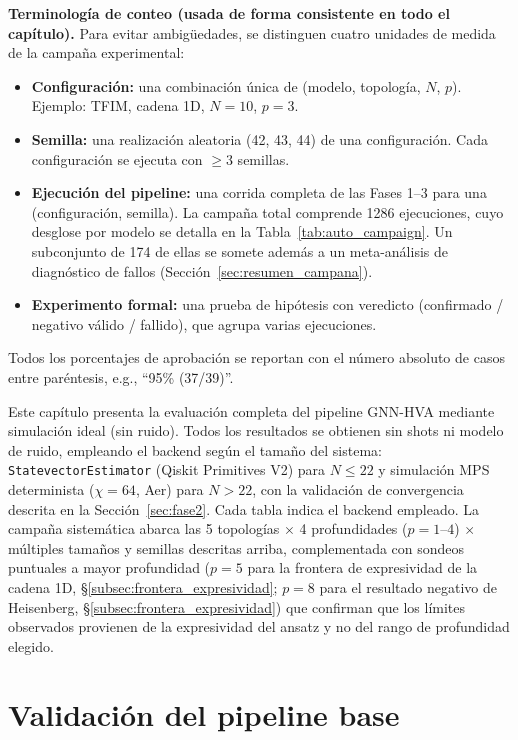 \documentclass[11pt,a4paper,spanish]{book}
\begin{document}
\noindent\textbf{Terminología de conteo (usada de forma consistente en todo el capítulo).} Para evitar ambigüedades, se distinguen cuatro unidades de medida de la campaña experimental:
\begin{itemize}
    \item \textbf{Configuración:} una combinación única de (modelo, topología, $N$, $p$). Ejemplo: TFIM, cadena 1D, $N = 10$, $p = 3$.
    \item \textbf{Semilla:} una realización aleatoria (42, 43, 44) de una configuración. Cada configuración se ejecuta con $\geq 3$ semillas.
    \item \textbf{Ejecución del pipeline:} una corrida completa de las Fases 1--3 para una (configuración, semilla). La campaña total comprende 1286 ejecuciones, cuyo desglose por modelo se detalla en la Tabla~\ref{tab:auto_campaign}. Un subconjunto de 174 de ellas se somete además a un meta-análisis de diagnóstico de fallos (Sección~\ref{sec:resumen_campana}).
    \item \textbf{Experimento formal:} una prueba de hipótesis con veredicto (confirmado / negativo válido / fallido), que agrupa varias ejecuciones.
\end{itemize}
\noindent Todos los porcentajes de aprobación se reportan con el número absoluto de casos entre paréntesis, e.g., ``95\% (37/39)''.

Este capítulo presenta la evaluación completa del pipeline GNN-HVA mediante simulación ideal (sin ruido). Todos los resultados se obtienen sin shots ni modelo de ruido, empleando el backend según el tamaño del sistema: \texttt{StatevectorEstimator} (Qiskit Primitives V2) para $N \leq 22$ y simulación MPS determinista ($\chi = 64$, Aer) para $N > 22$, con la validación de convergencia descrita en la Sección~\ref{sec:fase2}. Cada tabla indica el backend empleado. La campaña sistemática abarca las 5 topologías $\times$ 4 profundidades ($p = 1$--$4$) $\times$ múltiples tamaños y semillas descritas arriba, complementada con sondeos puntuales a mayor profundidad ($p = 5$ para la frontera de expresividad de la cadena 1D, §\ref{subsec:frontera_expresividad}; $p = 8$ para el resultado negativo de Heisenberg, §\ref{subsec:frontera_expresividad}) que confirman que los límites observados provienen de la expresividad del ansatz y no del rango de profundidad elegido.

\section{Validación del pipeline base}
\end{document}
